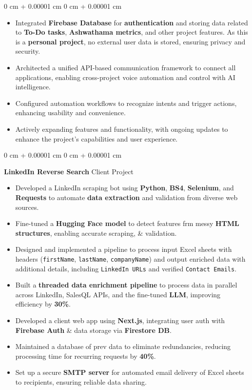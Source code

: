 \documentclass[10pt, letterpaper]{article}
\newenvironment{highlights}{
    \begin{itemize}[
        topsep=0.10 cm,
        parsep=0.10 cm,
        partopsep=0pt,
        itemsep=0pt,
        leftmargin=0 cm + 10pt
    ]
}{
    \end{itemize}
} %
\newenvironment{onecolentry}{
    \begin{adjustwidth}{
        0 cm + 0.00001 cm
    }{
        0 cm + 0.00001 cm
    }
}{
    \end{adjustwidth}
} %
\begin{document}
\begin{onecolentry}
\begin{highlights}
        \item Integrated \textbf{Firebase Database} for \textbf{authentication} and storing data related to \textbf{To-Do tasks}, \textbf{Ashwathama metrics}, and other project features. As this is a \textbf{personal project}, no external user data is stored, ensuring privacy and security.
        \item Architected a unified API-based communication framework to connect all applications, enabling cross-project voice automation and control with AI intelligence.
        \item Configured automation workflows to recognize intents and trigger actions, enhancing usability and convenience.
        \item Actively expanding features and functionality, with ongoing updates to enhance the project's capabilities and user experience.
    \end{highlights}
\end{onecolentry}

\vspace{0.15 cm}

\begin{onecolentry}
	\textbf{LinkedIn Reverse Search} \hfill Client Project
	\begin{highlights}
		\item Developed a LinkedIn scraping bot using \textbf{Python}, \textbf{BS4}, \textbf{Selenium}, and \textbf{Requests} to automate \textbf{data extraction} and validation from diverse web sources.
		\item Fine-tuned a \textbf{Hugging Face model} to detect features frm messy \textbf{HTML structures}, enabling accurate scraping, \& validation.
		\item Designed and implemented a pipeline to process input Excel sheets with headers (\texttt{firstName}, \texttt{lastName}, \texttt{companyName}) and output enriched data with additional details, including \texttt{LinkedIn URLs} and verified \texttt{Contact Emails}.
		\item Built a \textbf{threaded data enrichment pipeline} to process data in parallel across LinkedIn, SalesQL APIs, and the fine-tuned \textbf{LLM}, improving efficiency by \textbf{30\%}.
		\item Developed a client web app using \textbf{Next.js}, integrating user auth with \textbf{Firebase Auth} \& data storage via \textbf{Firestore DB}.
		\item Maintained a database of prev data to eliminate redundancies, reducing processing time for recurring requests by \textbf{40\%}.
		\item Set up a secure \textbf{SMTP server} for automated email delivery of Excel sheets to recipients, ensuring reliable data sharing.
	\end{highlights}
\end{onecolentry}
\end{document}
